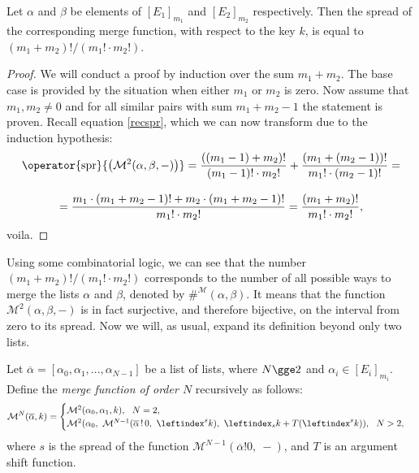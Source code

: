 \documentclass[12pt, a4paper]{article}
\newcommand{\M}{\mathcal{M}}
\newcommand{\spr}[1]{\operator{\mathrm{spr}}{\left(#1\right)}}
\newcommand{\lli}[1]{\leftindex_{#1}}
\newcommand{\lui}[1]{\leftindex^{#1}}
\newcommand{\wo}{\mathop{!}}
\begin{document}
\begin{proposition}
    Let $ \alpha $ and $ \beta $ be elements of $ [E_1]_{m_1} $ and $ [E_2]_{m_2} $ respectively. Then the spread of the corresponding merge function, with respect to the key $ k $, is equal to $ (m_1 + m_2)!/(m_1! \cdot m_2!) $.
\end{proposition}
\begin{proof}
    We will conduct a proof by induction over the sum $ m_1 + m_2 $. The base case is provided by the situation when either $ m_1 $ or $ m_2 $ is zero. Now assume that $ m_1, m_2 \ne 0 $ and for all similar pairs with sum $ m_1 + m_2 - 1 $ the statement is proven. Recall equation \ref{recspr}, which we can now transform due to the induction hypothesis:
    \begin{gather*}
        \spr{\M^2(\alpha, \beta, -)} = \frac{((m_1 - 1) + m_2)!}{(m_1 - 1)! \cdot m_2!} + \frac{(m_1 + (m_2 - 1))!}{m_1! \cdot (m_2 - 1)!} = \\[3mm]
        = \frac{m_1 \cdot (m_1 + m_2 - 1)! + m_2 \cdot (m_1 + m_2 - 1)!}{m_1! \cdot m_2!} = \frac{(m_1 + m_2)!}{m_1! \cdot m_2!},
    \end{gather*}
    voila.
\end{proof}

Using some combinatorial logic, we can see that the number $ (m_1 + m_2)!/(m_1! \cdot m_2!) $ corresponds to the number of all possible ways to merge the lists $ \alpha $ and $ \beta $, denoted by $ \#^{\M}(\alpha, \beta) $. It means that the function $ \M^2(\alpha, \beta, -) $ is in fact surjective, and therefore bijective, on the interval from zero to its spread. Now we will, as usual, expand its definition beyond only two lists.

\begin{definition}
    Let $ \overline{\alpha} = [\alpha_0, \alpha_1, ..., \alpha_{N-1}] $ be a list of lists, where $ N \gge 2 $ and $ \alpha_i \in [E_i]_{m_i} $. Define the \emph{merge function of order $ N $} recursively as follows:
    \[ \M^N(\overline{\alpha}, k) = \begin{cases}
        \M^2(\alpha_0, \alpha_1, k), \ \ N = 2,\\
        \M^2(\alpha_0,\ \M^{N-1}(\overline{\alpha} \wo 0, \ \lui{s}k),\ \lli{s}k + T(\lui{s}k)), \ \ N > 2,
    \end{cases} \]
    where $ s $ is the spread of the function $ \M^{N-1}(\overline{\alpha} \wo 0, \ -) $, and $ T $ is an argument shift function.
\end{definition}
\end{document}
